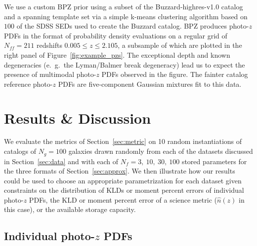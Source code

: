 \documentclass[\docopts]{\docclass}
\newcommand{\pz}{photo-$z$ PDF}
\begin{document}
We use a custom BPZ prior using a subset of the Buzzard-highres-v1.0 catalog 
and a spanning template set via a simple k-means clustering algorithm based on 
$100$ of the SDSS SEDs used to create the Buzzard catalog.
BPZ produces \pz s in the format of probability density evaluations on a 
regular grid of $N_{ff}=211$ redshifts $0.005\leq z\leq2.105$, a subsample of 
which are plotted in the right panel of Figure~\ref{fig:example_pzs}.
The exceptional depth and known degeneracies (e.~g.~the Lyman/Balmer break 
degeneracy) lead us to expect the presence of multimodal \pz s observed in the 
figure.
The fainter catalog reference \pz s are five-component Gaussian mixtures fit to 
this data.


\section{Results \& Discussion}
\label{sec:results}

We evaluate the metrics of Section~\ref{sec:metric} on 10 random instantiations 
of catalogs of $N_{g}=100$ galaxies drawn randomly from each of the datasets 
discussed in Section~\ref{sec:data} and with each of $N_{f}=3,\ 10,\ 30,\ 100$ 
stored parameters for the three formats of Section~\ref{sec:approx}.
We then illustrate how our results could be used to choose an appropriate 
parametrization for each dataset given constraints on the distribution of KLDs 
or moment percent errors of individual \pz s, the KLD or moment percent error 
of a science metric ($\hat{n}(z)$ in this case), or the available storage 
capacity.


\subsection{Individual \pz s}
\label{sec:individual_results}
\end{document}
